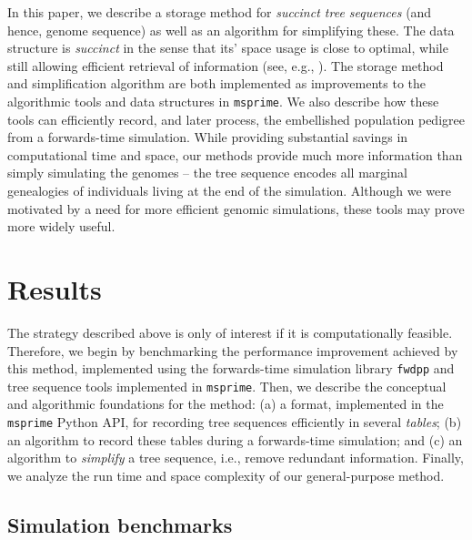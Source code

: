 \documentclass{article}
\newcommand{\fwdpp}{\texttt{fwdpp}}
\newcommand{\msprime}{\texttt{msprime}}
\begin{document}
In this paper, we describe a storage method for \emph{succinct tree sequences}
(and hence, genome sequence) as well as an algorithm for simplifying these.
The data structure is \emph{succinct} in the sense that its' space usage is close to optimal,
while still allowing efficient retrieval of information (see, e.g.,
\citet{gog2014theory}).
The storage method and simplification algorithm are both implemented
as improvements to the algorithmic tools and data structures in \msprime{}.
We also describe how these tools can efficiently record,
and later process, the embellished population pedigree from a forwards-time simulation.
While providing substantial savings in computational time and space, our methods provide much
more information than simply simulating the genomes -- the tree sequence
encodes all marginal genealogies of individuals living at the end of the simulation.
Although we were motivated by a need for more efficient genomic simulations,
these tools may prove more widely useful.


\section*{Results}


The strategy described above is only of interest if it is computationally feasible.
Therefore,
we begin by benchmarking the performance improvement achieved by this method,
implemented using the forwards-time simulation library \fwdpp{} \citep{fwdpp}
and tree sequence tools implemented in \msprime{}.
Then, we describe the conceptual and algorithmic foundations for the method:
(a) a format, implemented in the \msprime{} Python API,
for recording tree sequences efficiently in several \emph{tables};
(b) an algorithm to record these tables during a forwards-time simulation;
and (c) an algorithm to \emph{simplify} a tree sequence, i.e., remove redundant information.
Finally, we analyze the run time and space complexity of our general-purpose method.


\subsection*{Simulation benchmarks}
\end{document}
